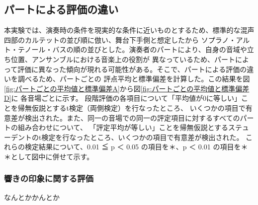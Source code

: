\documentclass[11pt,a4j]{jreport}
\begin{document}
  \subsection*{パートによる評価の違い}
  本実験では、演奏時の条件を現実的な条件に近いものとするため、標準的な混声四部のカルテットの並び順に倣い、舞台下手側と想定したから
  ソプラノ・アルト・テノール・バスの順の並びとした。演奏者のパートにより、自身の音域や立ち位置、アンサンブルにおける音楽上の役割が
  異なっているため、パートによって評価に異なった傾向が現れる可能性がある。そこで、パートによる評価の違いを調べるため、パートごとの
  評点平均と標準偏差を計算した。この結果を図\ref{fig:パートごとの平均値と標準偏差A}から図\ref{fig:パートごとの平均値と標準偏差D}に
  各音場ごとに示す。
  段階評価の各項目について「平均値が0に等しい」ことを帰無仮説とするt検定（両側検定）を行なったところ、
  いくつかの項目で有意差が検出された。また、同一の音場での同一の評定項目に対するすべてのパートの組み合わせについて、
  「評定平均が等しい」ことを帰無仮説とするステューデントのt検定を行なったところ、いくつかの項目で有意差が検出された。
  これらの検定結果について、0.01 ≦ p ＜ 0.05 の項目を＊、p ＜ 0.01 の項目を＊＊として図中に併せて示す。

  \subsubsection*{響きの印象に関する評価}
  なんとかかんとか
\end{document}
